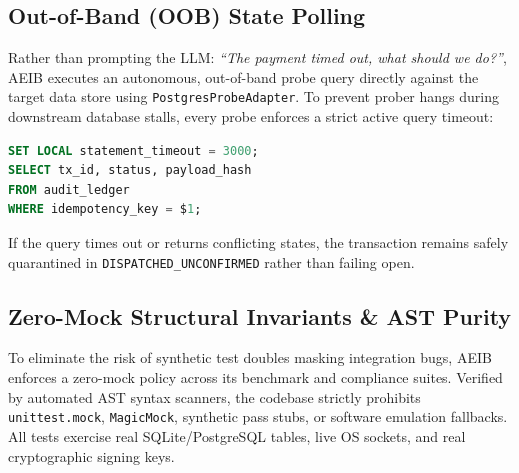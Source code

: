 \documentclass[10pt,journal,compsoc]{IEEEtran}
\begin{document}
\subsection{Out-of-Band (OOB) State Polling}
Rather than prompting the LLM: \emph{``The payment timed out, what should we do?''}, AEIB executes an autonomous, out-of-band probe query directly against the target data store using \texttt{PostgresProbeAdapter}. To prevent prober hangs during downstream database stalls, every probe enforces a strict active query timeout:
\begin{lstlisting}[language=SQL]
SET LOCAL statement_timeout = 3000;
SELECT tx_id, status, payload_hash 
FROM audit_ledger 
WHERE idempotency_key = $1;
\end{lstlisting}
If the query times out or returns conflicting states, the transaction remains safely quarantined in \texttt{DISPATCHED\_UNCONFIRMED} rather than failing open.

\subsection{Zero-Mock Structural Invariants \& AST Purity}
To eliminate the risk of synthetic test doubles masking integration bugs, AEIB enforces a zero-mock policy across its benchmark and compliance suites. Verified by automated AST syntax scanners, the codebase strictly prohibits \texttt{unittest.mock}, \texttt{MagicMock}, synthetic pass stubs, or software emulation fallbacks. All tests exercise real SQLite/PostgreSQL tables, live OS sockets, and real cryptographic signing keys.
\end{document}
